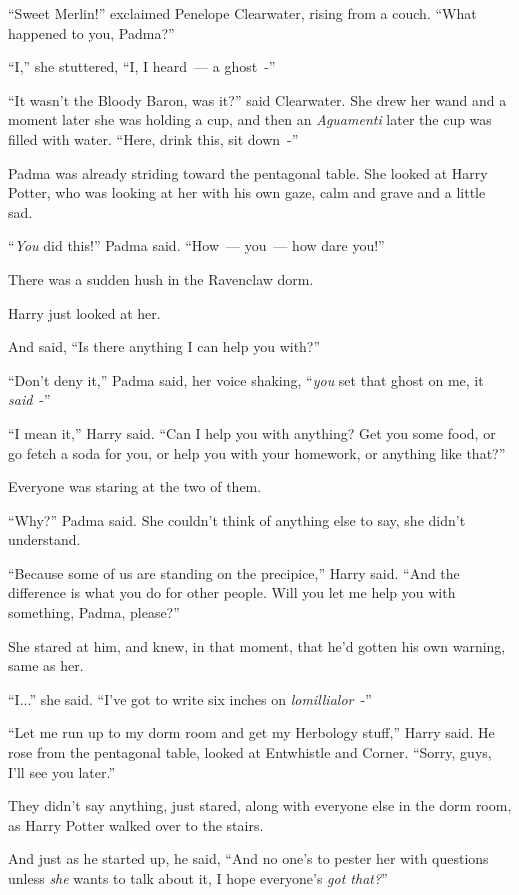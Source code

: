 ``Sweet Merlin!'' exclaimed Penelope Clearwater, rising from a couch. ``What happened to you, Padma?''

``I,'' she stuttered, ``I, I heard~--- a ghost~-''

``It wasn't the Bloody Baron, was it?'' said Clearwater. She drew her wand and a moment later she was holding a cup, and then an \emph{Aguamenti} later the cup was filled with water. ``Here, drink this, sit down~-''

Padma was already striding toward the pentagonal table. She looked at Harry Potter, who was looking at her with his own gaze, calm and grave and a little sad.

``\emph{You} did this!'' Padma said. ``How~--- you~--- how dare you!''

There was a sudden hush in the Ravenclaw dorm.

Harry just looked at her.

And said, ``Is there anything I can help you with?''

``Don't deny it,'' Padma said, her voice shaking, ``\emph{you} set that ghost on me, it \emph{said}~-''

``I mean it,'' Harry said. ``Can I help you with anything? Get you some food, or go fetch a soda for you, or help you with your homework, or anything like that?''

Everyone was staring at the two of them.

``Why?'' Padma said. She couldn't think of anything else to say, she didn't understand.

``Because some of us are standing on the precipice,'' Harry said. ``And the difference is what you do for other people. Will you let me help you with something, Padma, please?''

She stared at him, and knew, in that moment, that he'd gotten his own warning, same as her.

``I...'' she said. ``I've got to write six inches on \emph{lomillialor}~-''

``Let me run up to my dorm room and get my Herbology stuff,'' Harry said. He rose from the pentagonal table, looked at Entwhistle and Corner. ``Sorry, guys, I'll see you later.''

They didn't say anything, just stared, along with everyone else in the dorm room, as Harry Potter walked over to the stairs.

And just as he started up, he said, ``And no one's to pester her with questions unless \emph{she} wants to talk about it, I hope everyone's \emph{got that?}''

